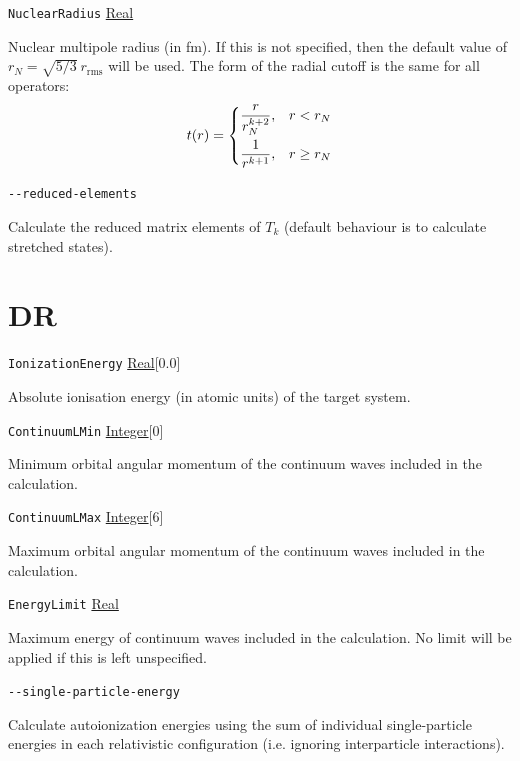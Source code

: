 \documentclass{report}
\begin{document}
\texttt{NuclearRadius} \uline{Real}
\begin{adjustwidth}{1cm}{}
Nuclear multipole radius (in fm). If this is not specified, then the default value of $r_N = \sqrt{5/3} ~ r_{\textrm{rms}}$ will be used. The form of the radial cutoff is the same for all operators:
\[
t(r) = \begin{dcases}
\frac{r}{r_N^{k+2}}, & r < r_N \\
\frac{1}{r^{k+1}}, & r \geq r_N \\
\end{dcases}
\]
\end{adjustwidth}

\texttt{{-}{-}reduced-elements} 
\begin{adjustwidth}{1cm}{}
	Calculate the reduced matrix elements of $T_k$ (default behaviour is to calculate stretched states).
\end{adjustwidth}
\section{DR} %

\texttt{IonizationEnergy} \uline{Real}[0.0]
\begin{adjustwidth}{1cm}{}
Absolute ionisation energy (in atomic units) of the target system.
\end{adjustwidth}

\texttt{ContinuumLMin} \uline{Integer}[0]
\begin{adjustwidth}{1cm}{}
Minimum orbital angular momentum of the continuum waves included in the calculation. 
\end{adjustwidth}

\texttt{ContinuumLMax} \uline{Integer}[6]
\begin{adjustwidth}{1cm}{}
Maximum orbital angular momentum of the continuum waves included in the calculation. 
\end{adjustwidth}

\texttt{EnergyLimit} \uline{Real}
\begin{adjustwidth}{1cm}{}
Maximum energy of continuum waves included in the calculation. No limit will be applied if this is left
unspecified.
\end{adjustwidth}

\texttt{{-}{-}single-particle-energy}
\begin{adjustwidth}{1cm}{}
Calculate autoionization energies using the sum of individual single-particle energies in each
relativistic configuration (i.e. ignoring interparticle interactions).
\end{adjustwidth}
\end{document}
